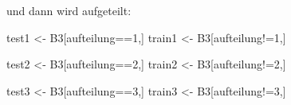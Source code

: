 \documentclass[12pt,]{book}
\newenvironment{Shaded}{\begin{snugshade}}{\end{snugshade}}
\newcommand{\DecValTok}[1]{\textcolor[rgb]{0.00,0.00,0.81}{{#1}}}
\newcommand{\StringTok}[1]{\textcolor[rgb]{0.31,0.60,0.02}{{#1}}}
\newcommand{\NormalTok}[1]{{#1}}
\begin{document}
und dann wird aufgeteilt:

\begin{Shaded}
\begin{Highlighting}[]
\NormalTok{test1 <-}\StringTok{ }\NormalTok{B3[aufteilung==}\DecValTok{1}\NormalTok{,]}
\NormalTok{train1 <-}\StringTok{ }\NormalTok{B3[aufteilung!=}\DecValTok{1}\NormalTok{,]}

\NormalTok{test2 <-}\StringTok{ }\NormalTok{B3[aufteilung==}\DecValTok{2}\NormalTok{,]}
\NormalTok{train2 <-}\StringTok{ }\NormalTok{B3[aufteilung!=}\DecValTok{2}\NormalTok{,]}

\NormalTok{test3 <-}\StringTok{ }\NormalTok{B3[aufteilung==}\DecValTok{3}\NormalTok{,]}
\NormalTok{train3 <-}\StringTok{ }\NormalTok{B3[aufteilung!=}\DecValTok{3}\NormalTok{,]}
\end{Highlighting}
\end{Shaded}
\end{document}
